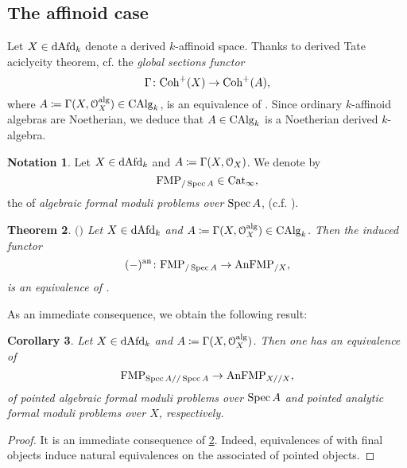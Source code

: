 \documentclass[10pt,a4paper,reqno]{amsart} %
\theoremstyle{plain}
\newtheorem{thm}{Theorem}[section]
\newtheorem{cor}[thm]{Corollary}
\theoremstyle{definition}
\newtheorem{notation}[thm]{Notation}
\theoremstyle{remark}
\numberwithin{equation}{section}
\begin{document}
\subsection{The affinoid case} Let $X \in \mathrm{dAfd}_k$ denote a derived $k$-affinoid space.
Thanks to derived Tate aciclycity theorem, cf. \cite[Theorem 3.1]{Porta_Yu_Derived_Hom_spaces}
the \emph{global sections functor}
    \[
        \Gamma \colon \mathrm{Coh}^+(X) \to  \mathrm{Coh}^+(A),
    \]
where $A \coloneqq \Gamma(X, \mathcal O_X ^\mathrm{alg}) \in \mathrm{CAlg}_k$, is an equivalence of \infcats. Since ordinary $k$-affinoid algebras are Noetherian, we deduce that
$A \in \mathrm{CAlg}_k$ is a Noetherian derived $k$-algebra.

\begin{notation}
    Let $X \in \mathrm{dAfd}_k$ and $A \coloneqq \Gamma(X, \mathcal O_X)$. We denote by
        \[
            \mathrm{FMP}_{/\operatorname{Spec} A} \in \mathrm{Cat}_\infty,  
        \]
    the \infcat of \emph{algebraic formal moduli problems over $\operatorname{Spec} A$}, (c.f. \cite[Definition 6.11]{Porta_Yu_NQK}).
\end{notation}

\begin{thm}$\mathrm{(}$\cite[Theorem 6.12]{Porta_Yu_NQK}$\mathrm )$ \label{thm:equivalence_between_analytic_and_algebraic_formal_moduli_problems_over}
    Let $X \in \mathrm{dAfd}_k$ and $A \coloneqq \Gamma(X, \mathcal O_X^\mathrm{alg}) \in \mathrm{CAlg}_k$. Then the induced functor
        \[
            (-) ^\mathrm{an} \colon \mathrm{FMP}_{/ \operatorname{Spec} A} \to \mathrm{AnFMP}_{/X},
        \]
    is an equivalence of \infcats.
\end{thm}

As an immediate consequence, we obtain the following result:

\begin{cor} \label{cor:equivalence_between_pointed_analytic_and_algebraic_formal_moduli_problems_over}
    Let $X \in \mathrm{dAfd}_k$ and $A \coloneqq \Gamma(X, \mathcal O_X^\mathrm{alg})$. Then one has an equivalence of \infcats
        \[
            \mathrm{FMP}_{\operatorname{Spec} A/ /\operatorname{Spec} A} \to \mathrm{AnFMP}_{X/ /X} ,
        \]
    of pointed algebraic formal moduli problems over $\operatorname{Spec} A$ and pointed analytic formal moduli problems over $X$, respectively.
\end{cor}

\begin{proof}
    It is an immediate consequence of \cref{thm:equivalence_between_analytic_and_algebraic_formal_moduli_problems_over}. Indeed, equivalences of \infcats with final objects
    induce natural equivalences on the associated \infcats of pointed objects.
\end{proof}
\end{document}
